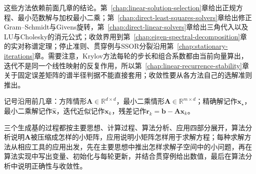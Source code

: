 这些方法依赖前面几章的结论。第~\ref{chap:linear-solution-selection}章给出正规方程、最小范数解与加权最小二乘；第~\ref{chap:direct-least-squares-solvers}章给出修正Gram--Schmidt与Givens旋转，第~\ref{chap:direct-linear-solvers}章给出三角代入以及LU与Cholesky的消元公式；收敛界用到第~\ref{chap:eigen-spectral-decomposition}章的实对称谱定理；停止准则、贯穿例与SSOR分裂沿用第~\ref{chap:stationary-iterations}章。需要注意，Krylov方法每轮的步长和组合系数都由当前向量算出，迭代不是同一个线性映射的反复作用，所以第~\ref{chap:linear-recurrence-stability}章关于固定误差矩阵的谱半径判据不能直接套用；收敛性要从各方法自己的选解准则推出。

记号沿用前几章：方阵情形$\bm A\in\mathbb R^{d\times d}$，最小二乘情形$\bm A\in\mathbb R^{m\times d}$；精确解记作$\bm x_\star$，最小二乘解记作$\hat{\bm x}$，迭代近似记作$\bm x_k$，残差记作$\bm r_k=\bm b-\bm A\bm x_k$。

三个生成基的过程都按主要思想、计算过程、算法分析、应用四部分展开，算法分析说明$\bm A$被压缩成怎样的小矩阵，应用说明小矩阵怎样用于求解方程；每种求解方法从相应工具的应用出发，先在主要思想中推出怎样求解子空间中的小问题，再在算法实现中写出变量、初始化与每轮更新，并结合贯穿例给出数值，最后在算法分析中说明正确性与收敛性。














